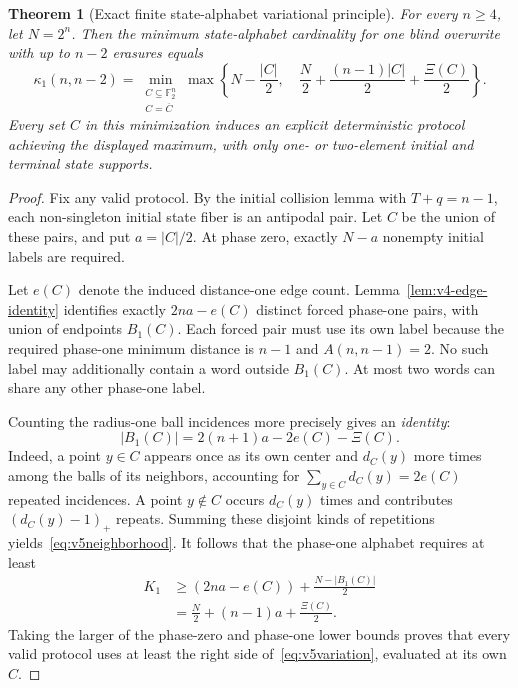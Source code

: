 \documentclass[11pt,a4paper]{article}
\newtheorem{theorem}{Theorem}[section]
\newcommand{\F}{\mathbb F_2}
\begin{document}
\begin{theorem}[Exact finite state-alphabet variational principle]\label{thm:v5variation}
For every $n\ge4$, let $N=2^n$. Then the minimum state-alphabet cardinality for one blind overwrite with up to $n-2$ erasures equals
\begin{equation}\label{eq:v5variation}
\boxed{\quad
 \kappa_1(n,n-2)=
 \min_{\substack{C\subseteq\F^n\\ C=\overline C}}
 \max\left\{N-\frac{|C|}{2},\quad
   \frac N2+\frac{(n-1)|C|}{2}+\frac{\Xi(C)}2\right\}.
\quad}
\end{equation}
Every set $C$ in this minimization induces an explicit deterministic protocol achieving the displayed maximum, with only one- or two-element initial and terminal state supports.
\end{theorem}
\begin{proof}
Fix any valid protocol. By the initial collision lemma with $T+q=n-1$, each non-singleton initial state fiber is an antipodal pair. Let $C$ be the union of these pairs, and put $a=|C|/2$. At phase zero, exactly $N-a$ nonempty initial labels are required.

Let $e(C)$ denote the induced distance-one edge count. Lemma~\ref{lem:v4-edge-identity} identifies exactly $2na-e(C)$ distinct forced phase-one pairs, with union of endpoints $B_1(C)$. Each forced pair must use its own label because the required phase-one minimum distance is $n-1$ and $A(n,n-1)=2$. No such label may additionally contain a word outside $B_1(C)$. At most two words can share any other phase-one label.

Counting the radius-one ball incidences more precisely gives an \emph{identity}:
\begin{equation}\label{eq:v5neighborhood}
 |B_1(C)|=2(n+1)a-2e(C)-\Xi(C).
\end{equation}
Indeed, a point $y\in C$ appears once as its own center and $d_C(y)$ more times among the balls of its neighbors, accounting for $\sum_{y\in C}d_C(y)=2e(C)$ repeated incidences. A point $y\notin C$ occurs $d_C(y)$ times and contributes $(d_C(y)-1)_+$ repeats. Summing these disjoint kinds of repetitions yields~\eqref{eq:v5neighborhood}. It follows that the phase-one alphabet requires at least
\begin{align*}
 K_1&\ge (2na-e(C))+\frac{N-|B_1(C)|}{2}\\
 &=\frac N2+(n-1)a+\frac{\Xi(C)}2.
\end{align*}
Taking the larger of the phase-zero and phase-one lower bounds proves that every valid protocol uses at least the right side of~\eqref{eq:v5variation}, evaluated at its own $C$.


\end{proof}
\end{document}
